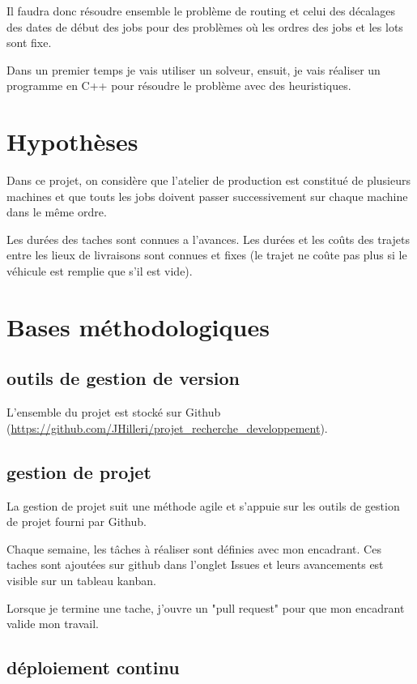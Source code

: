Il faudra donc résoudre ensemble le problème de routing et celui des décalages des dates de début des jobs pour des problèmes où les ordres des jobs et les lots sont fixe.

Dans un premier temps je vais utiliser un solveur, ensuit, je vais réaliser un programme en C++ pour résoudre le problème avec des heuristiques.

\section{Hypothèses}
Dans ce projet, on considère que l'atelier de production est constitué de plusieurs machines et que touts les jobs doivent passer successivement sur chaque machine dans le même ordre.

Les durées des taches sont connues a l'avances.
Les durées et les coûts des trajets entre les lieux de livraisons sont connues et fixes (le trajet ne coûte pas plus si le véhicule est remplie que s'il est vide).


\section{Bases méthodologiques}
\subsection{outils de gestion de version}
L'ensemble du projet est stocké sur Github (\url{https://github.com/JHilleri/projet_recherche_developpement}).

\subsection{gestion de projet}
La gestion de projet suit une méthode agile et s'appuie sur les outils de gestion de projet fourni par Github.

Chaque semaine, les tâches à réaliser sont définies avec mon encadrant.
Ces taches sont ajoutées sur github dans l'onglet Issues et leurs avancements est visible sur un tableau kanban.

Lorsque je termine une tache, j'ouvre un "pull request" pour que mon encadrant valide mon travail.

\subsection{déploiement continu}
